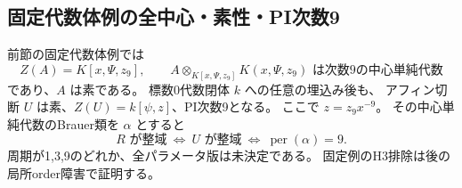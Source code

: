 \subsection{固定代数体例の全中心・素性・PI次数9}
\label{subsec:cubic-third-root-unit-boundary-L-finite-CSA}
\begin{theorem}[階数81の基準例の全中心と中心単純次数]
\label{thm:cubic-third-root-unit-boundary-L-finite-CSA}
前節の固定代数体例では
\[
 Z(A)=K[x,\Psi,z_9],\qquad
 A\otimes_{K[x,\Psi,z_9]}K(x,\Psi,z_9)
 \text{ は次数9の中心単純代数}
\]
であり、$A$ は素である。
標数0代数閉体 $k$ への任意の埋込み後も、
アフィン切断 $U$ は素、$Z(U)=k[\psi,z]$、PI次数9となる。
ここで $z=z_9x^{-9}$。
その中心単純代数のBrauer類を $\alpha$ とすると
\[
 R\text{ が整域}\ \Longleftrightarrow\ U\text{ が整域}
 \ \Longleftrightarrow\ \operatorname{per}(\alpha)=9.
\]
周期が1,3,9のどれか、全パラメータ版は未決定である。
固定例のH3排除は後の局所order障害で証明する。
\end{theorem}
